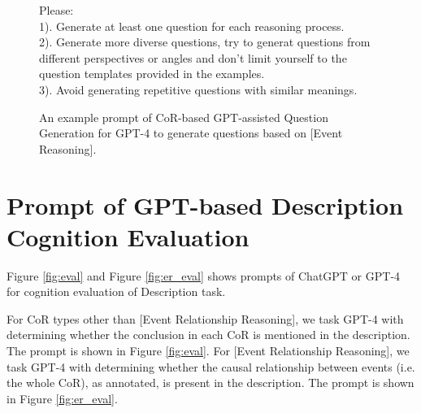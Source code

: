 \begin{figure*}
\begin{tcolorbox}
    Please: \\
    1). Generate at least one question for each reasoning process. \\
    2). Generate more diverse questions, try to generat questions from different perspectives or angles and don't limit yourself to the question templates provided in the examples. \\
    3). Avoid generating repetitive questions with similar meanings. \\
    \end{tcolorbox}
    \caption{An example prompt of CoR-based GPT-assisted Question Generation for GPT-4 to generate questions based on [Event Reasoning].}
    \label{fig:cgqg_prompt}
  \end{figure*}

\section{Prompt of GPT-based Description Cognition Evaluation}
\label{sec:cogid_eval_prompt}

Figure \ref{fig:eval} and Figure \ref{fig:er_eval} shows prompts of ChatGPT or GPT-4 for cognition evaluation of Description task. 

For CoR types other than [Event Relationship Reasoning], we task GPT-4 with determining whether the conclusion in each CoR is mentioned in the description. 
The prompt is shown in Figure \ref{fig:eval}.
For [Event Relationship Reasoning], we task GPT-4 with determining whether the causal relationship between events (i.e. the whole CoR), as annotated, is present in the description.
The prompt is shown in Figure \ref{fig:er_eval}.


